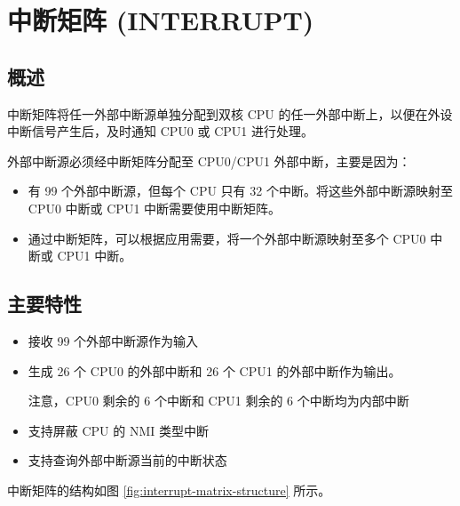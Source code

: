 \documentclass[main\_\_CN.tex]{subfiles}
\begin{document}

\ifglobal
\else
    {\let\clearpage\relax \listoftodos}
    \tableofcontents
\fi



\hypertarget{intmtrx}{}
\chapter{中断矩阵 (INTERRUPT)}
\label{mod:intmtrx}


\section{概述}

\chipname{} 中断矩阵将任一外部中断源单独分配到双核 CPU 的任一外部中断上，以便在外设中断信号产生后，及时通知 CPU0 或 CPU1 进行处理。

外部中断源必须经中断矩阵分配至 CPU0/CPU1 外部中断，主要是因为：
\begin{itemize}
    \item \chipname{} 有 99 个外部中断源，但每个 CPU 只有 32 个中断。将这些外部中断源映射至 CPU0 中断或 CPU1 中断需要使用中断矩阵。
    \item 通过中断矩阵，可以根据应用需要，将一个外部中断源映射至多个 CPU0 中断或 CPU1 中断。
\end{itemize}

\section{主要特性}

\begin{itemize}
    \item 接收 99 个外部中断源作为输入
    \item 生成 26 个 CPU0 的外部中断和 26 个 CPU1 的外部中断作为输出。

    注意，CPU0 剩余的 6 个中断和 CPU1 剩余的 6 个中断均为内部中断
    \item 支持屏蔽 CPU 的 NMI 类型中断
    \item 支持查询外部中断源当前的中断状态
\end{itemize}

中断矩阵的结构如图 \ref{fig:interrupt-matrix-structure} 所示。
\end{document}
